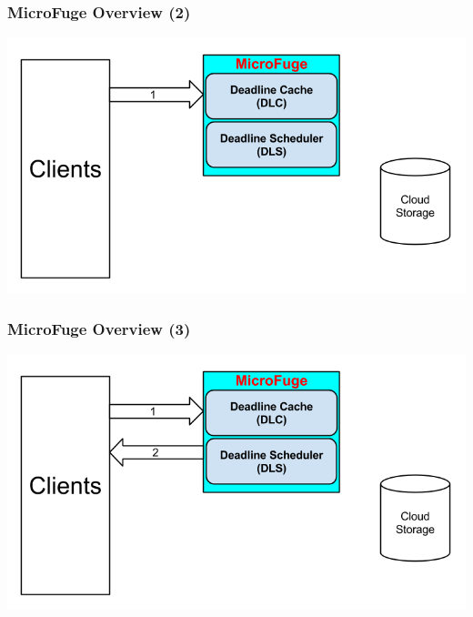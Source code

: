\documentclass{beamer}
\begin{document}
\begin{frame}
  \frametitle{MicroFuge Overview (2)}
  \begin{center}
    \includegraphics[scale=0.39]{img/MF_FULL_V8_2.png}
  \end{center}
\end{frame}

\begin{frame}
  \frametitle{MicroFuge Overview (3)}
  \begin{center}
    \includegraphics[scale=0.39]{img/MF_FULL_V8_3.png}
  \end{center}
\end{frame}
\end{document}

